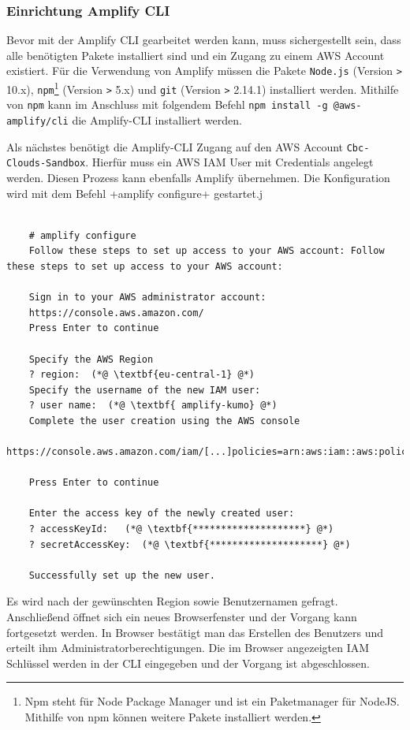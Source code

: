 \subsubsection{Einrichtung Amplify CLI}
\label{EinrichtungAmplify}
Bevor mit der Amplify CLI gearbeitet werden kann, muss sichergestellt sein, dass alle benötigten Pakete installiert sind und ein Zugang zu einem AWS Account existiert.
Für die Verwendung von Amplify müssen die Pakete \verb+Node.js+ (Version \verb+>+ 10.x), \verb+npm+\footnote{Npm steht für Node Package Manager und ist ein Paketmanager für NodeJS. Mithilfe von npm können weitere Pakete installiert werden.} (Version \verb+>+ 5.x) und \verb+git+ (Version \verb+>+ 2.14.1) installiert werden.
Mithilfe von \verb+npm+ kann im Anschluss mit folgendem Befehl \verb+npm install -g @aws-amplify/cli+ die Amplify-CLI installiert werden.

Als nächstes benötigt die Amplify-CLI Zugang auf den AWS Account \verb+Cbc-Clouds-Sandbox+.
Hierfür muss ein AWS IAM User mit Credentials angelegt werden.
Diesen Prozess kann ebenfalls Amplify übernehmen.
Die Konfiguration wird mit dem Befehl \spverb+amplify configure+ gestartet.j


\begin{lstlisting}[basicstyle=\ttfamily\small, breaklines=true , frame = single, backgroundcolor=\color{lavender} ]

    # amplify configure
    Follow these steps to set up access to your AWS account: Follow these steps to set up access to your AWS account:

    Sign in to your AWS administrator account:
    https://console.aws.amazon.com/
    Press Enter to continue

    Specify the AWS Region
    ? region:  (*@ \textbf{eu-central-1} @*)
    Specify the username of the new IAM user:
    ? user name:  (*@ \textbf{ amplify-kumo} @*)
    Complete the user creation using the AWS console
    https://console.aws.amazon.com/iam/[...]policies=arn:aws:iam::aws:policy%2FAdministratorAccess

    Press Enter to continue

    Enter the access key of the newly created user:
    ? accessKeyId:   (*@ \textbf{********************} @*)
    ? secretAccessKey:  (*@ \textbf{********************} @*)

    Successfully set up the new user.
\end{lstlisting}

Es wird nach der gewünschten Region sowie Benutzernamen gefragt.
Anschließend öffnet sich ein neues Browserfenster und der Vorgang kann fortgesetzt werden.
In Browser bestätigt man das Erstellen des Benutzers und erteilt ihm Administratorberechtigungen.
Die im Browser angezeigten IAM Schlüssel werden in der CLI eingegeben und der Vorgang ist abgeschlossen.\cite[]{ImpVoraus}

